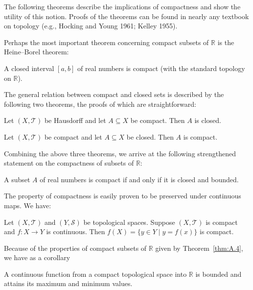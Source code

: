 The following theorems describe the implications of compactness and show the
utility of this notion. Proofs of the theorems can be found in nearly any textbook on
topology (e.g., Hocking and Young 1961; Kelley 1955).

Perhaps the most important theorem concerning compact subsets of \(\mathbb R\) is
the Heine--Borel theorem:

\begin{theorem}\label{thm:A.1}
A closed interval \([a,b]\) of real numbers is compact (with the standard topology
on \(\mathbb R\)).
\end{theorem}

The general relation between compact and closed sets is described by the following
two theorems, the proofs of which are straightforward:

\begin{theorem}\label{thm:A.2}
Let \((X,\mathcal T)\) be Hausdorff and let \(A\subseteq X\) be compact. Then \(A\)
is closed.
\end{theorem}

\begin{theorem}\label{thm:A.3}
Let \((X,\mathcal T)\) be compact and let \(A\subseteq X\) be closed. Then \(A\) is
compact.
\end{theorem}

Combining the above three theorems, we arrive at the following strengthened
statement on the compactness of subsets of \(\mathbb R\):

\begin{theorem}\label{thm:A.4}
A subset \(A\) of real numbers is compact if and only if it is closed and bounded.
\end{theorem}

The property of compactness is easily proven to be preserved under continuous maps.
We have:

\begin{theorem}\label{thm:A.5}
Let \((X,\mathcal T)\) and \((Y,\mathcal S)\) be topological spaces. Suppose
\((X,\mathcal T)\) is compact and \(f:X\to Y\) is continuous. Then
\(f(X)=\{y\in Y\mid y=f(x)\}\) is compact.
\end{theorem}

Because of the properties of compact subsets of \(\mathbb R\) given by
Theorem~\ref{thm:A.4}, we have as a corollary

\begin{theorem}\label{thm:A.6}
A continuous function from a compact topological space into \(\mathbb R\) is bounded
and attains its maximum and minimum values.
\end{theorem}


